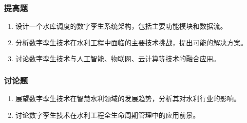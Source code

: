 \subsubsection{提高题}\label{ux63d0ux9ad8ux9898-7}

\begin{enumerate}
\def\labelenumi{\arabic{enumi}.}
\setcounter{enumi}{3}
\tightlist
\item
  设计一个水库调度的数字孪生系统架构，包括主要功能模块和数据流。
\item
  分析数字孪生技术在水利工程中面临的主要技术挑战，提出可能的解决方案。
\item
  讨论数字孪生技术与人工智能、物联网、云计算等技术的融合应用。
\end{enumerate}

\subsubsection{讨论题}\label{ux8ba8ux8bbaux9898-7}

\begin{enumerate}
\def\labelenumi{\arabic{enumi}.}
\setcounter{enumi}{6}
\tightlist
\item
  展望数字孪生技术在智慧水利领域的发展趋势，分析其对水利行业的影响。
\item
  讨论数字孪生技术在水利工程全生命周期管理中的应用前景。
\end{enumerate}
